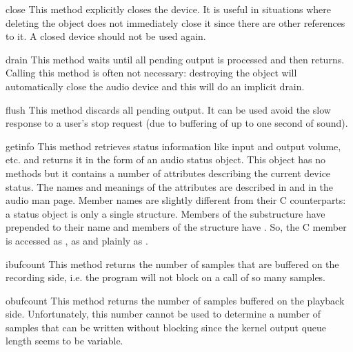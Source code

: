 \begin{funcdesc}{close}{}
This method explicitly closes the device. It is useful in situations
where deleting the object does not immediately close it since there
are other references to it. A closed device should not be used again.
\end{funcdesc}

\begin{funcdesc}{drain}{}
This method waits until all pending output is processed and then returns.
Calling this method is often not necessary: destroying the object will
automatically close the audio device and this will do an implicit drain.
\end{funcdesc}

\begin{funcdesc}{flush}{}
This method discards all pending output. It can be used avoid the
slow response to a user's stop request (due to buffering of up to one
second of sound).
\end{funcdesc}

\begin{funcdesc}{getinfo}{}
This method retrieves status information like input and output volume,
etc. and returns it in the form of
an audio status object. This object has no methods but it contains a
number of attributes describing the current device status. The names
and meanings of the attributes are described in
 and in the audio man page. Member names
are slightly different from their C counterparts: a status object is
only a single structure. Members of the  substructure have
 prepended to their name and members of the 
structure have . So, the C member  is
accessed as ,  as 
and  plainly as .
\end{funcdesc}

\begin{funcdesc}{ibufcount}{}
This method returns the number of samples that are buffered on the
recording side, i.e.
the program will not block on a  call of so many samples.
\end{funcdesc}

\begin{funcdesc}{obufcount}{}
This method returns the number of samples buffered on the playback
side. Unfortunately, this number cannot be used to determine a number
of samples that can be written without blocking since the kernel
output queue length seems to be variable.
\end{funcdesc}

